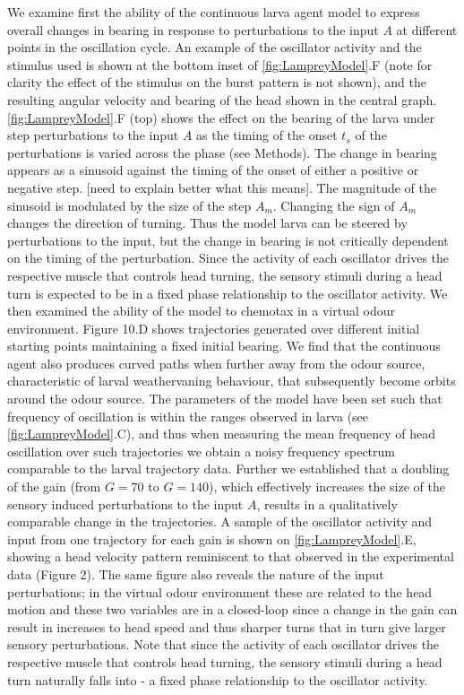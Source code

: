 \documentclass[10pt,a4paper]{article}
\begin{document}
We examine first the ability of the continuous larva agent model to express overall changes in bearing in response to perturbations to the input $A$ at different points in the oscillation cycle. An example of the oscillator activity and the stimulus used is shown at the bottom inset of \ref{fig:LampreyModel}.F (note for clarity the effect of the stimulus on the burst pattern is not shown), and the resulting angular velocity and bearing of the head shown in the central graph. \ref{fig:LampreyModel}.F (top) shows the effect on the bearing of the larva under step perturbations to the input $A$ as the timing of the onset $t_s$ of the perturbations is varied across the phase (see Methods). The change in bearing appears as a sinusoid against the timing of the onset of either a positive or negative step. [need to explain better what this means]. The magnitude of the sinusoid is modulated by the size of the step $A_m$. Changing the sign of $A_m$ changes the direction of turning. Thus the model larva can be steered by perturbations to the input, but the change in bearing is not critically dependent on the timing of the perturbation. Since the activity of each oscillator drives the respective muscle that controls head turning, the sensory stimuli during a head turn is expected to be in a fixed phase relationship to the oscillator activity.
We then examined the ability of the model to chemotax in a virtual odour environment. Figure 10.D shows trajectories generated over different initial starting points maintaining a fixed initial bearing. We find that the continuous agent also produces curved paths when further away from the odour source, characteristic of larval weathervaning behaviour, that subsequently become orbits around the odour source. The parameters of the model have been set such that frequency of oscillation is within the ranges observed in larva (see \ref{fig:LampreyModel}.C), and thus when measuring the mean frequency of head oscillation over such trajectories we obtain a noisy frequency spectrum comparable to the larval trajectory data. Further we established that a doubling of the gain (from $G=70$ to $G=140$), which effectively increases the size of the sensory induced perturbations to the input $A$, results in a qualitatively comparable change in the trajectories. A sample of the oscillator activity and input from one trajectory for each gain is shown on \ref{fig:LampreyModel}.E, showing a head velocity pattern reminiscent to that observed in the experimental data (Figure 2). The same figure also reveals the nature of the input perturbations; in the virtual odour environment these are related to the head motion and these two variables are in a closed-loop since a change in the gain can result in increases to head speed and thus  sharper turns that in turn give larger sensory perturbations. Note that since the activity of each oscillator drives the respective muscle that controls head turning, the sensory stimuli during a head turn naturally falls into - a fixed phase relationship to the oscillator activity.
\end{document}
